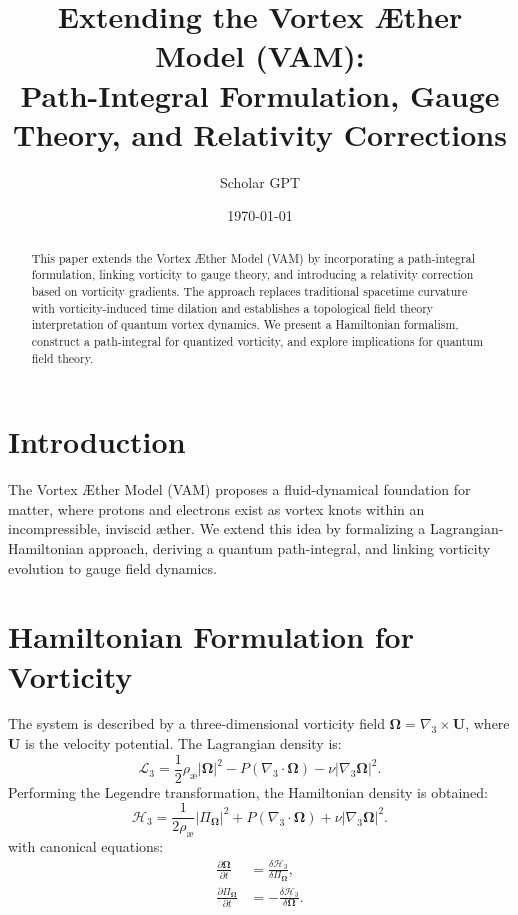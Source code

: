 \documentclass[12pt]{article}
\title{Extending the Vortex Æther Model (VAM): \\ Path-Integral Formulation, Gauge Theory, and Relativity Corrections}
\author{Scholar GPT}
\date{\today}
\begin{document}
\maketitle

    \begin{abstract}
        This paper extends the Vortex Æther Model (VAM) by incorporating a path-integral formulation, linking vorticity to gauge theory, and introducing a relativity correction based on vorticity gradients. The approach replaces traditional spacetime curvature with vorticity-induced time dilation and establishes a topological field theory interpretation of quantum vortex dynamics. We present a Hamiltonian formalism, construct a path-integral for quantized vorticity, and explore implications for quantum field theory.
    \end{abstract}

    \section{Introduction}
    The Vortex Æther Model (VAM) proposes a fluid-dynamical foundation for matter, where protons and electrons exist as vortex knots within an incompressible, inviscid æther. We extend this idea by formalizing a Lagrangian-Hamiltonian approach, deriving a quantum path-integral, and linking vorticity evolution to gauge field dynamics.

    \section{Hamiltonian Formulation for Vorticity}
    The system is described by a three-dimensional vorticity field $\boldsymbol{\Omega} = \nabla_3 \times \mathbf{U}$, where $\mathbf{U}$ is the velocity potential. The Lagrangian density is:
        \begin{equation}
            \mathcal{L}_3 = \frac{1}{2} \rho_{\text{\ae}} |\boldsymbol{\Omega}|^2 - P (\nabla_3 \cdot \boldsymbol{\Omega}) - \nu |\nabla_3 \boldsymbol{\Omega}|^2.
        \end{equation}
    Performing the Legendre transformation, the Hamiltonian density is obtained:
        \begin{equation}
            \mathcal{H}_3 = \frac{1}{2 \rho_{\text{\ae}}} |\Pi_{\boldsymbol{\Omega}}|^2 + P (\nabla_3 \cdot \boldsymbol{\Omega}) + \nu |\nabla_3 \boldsymbol{\Omega}|^2.
        \end{equation}
    with canonical equations:
        \begin{align}
            \frac{\partial \boldsymbol{\Omega}}{\partial t} &= \frac{\delta \mathcal{H}_3}{\delta \Pi_{\boldsymbol{\Omega}}}, \\
            \frac{\partial \Pi_{\boldsymbol{\Omega}}}{\partial t} &= -\frac{\delta \mathcal{H}_3}{\delta \boldsymbol{\Omega}}.
        \end{align}
\end{document}
